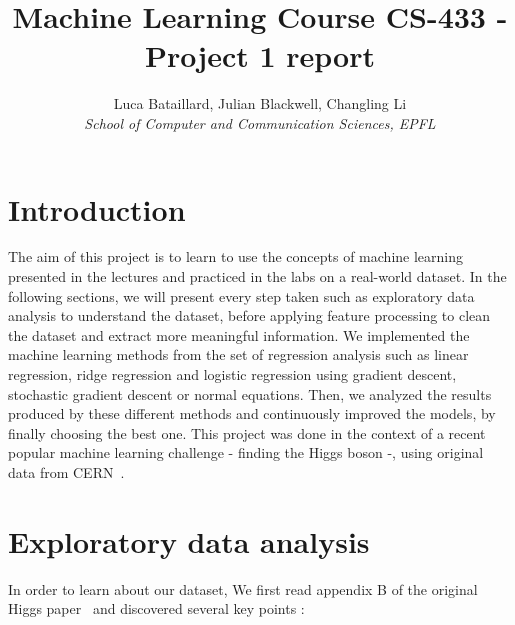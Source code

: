 \documentclass[10pt,conference,compsocconf]{IEEEtran}
\begin{document}
\title{Machine Learning Course CS-433 - Project 1 report}

\author{
  Luca Bataillard, Julian Blackwell, Changling Li\\
  \textit{School of Computer and Communication Sciences, EPFL}
}

\maketitle

\section{Introduction}
The aim of this project is to learn to use the concepts of machine learning presented in the lectures and practiced in the labs on a
real-world dataset. In the following sections, we will present every step taken such as exploratory data analysis to understand the dataset, before applying feature processing to clean the dataset and extract more meaningful information. We implemented the machine learning methods from the set of regression analysis such as linear regression, ridge regression and logistic regression using gradient descent, stochastic gradient descent or normal equations. Then, we analyzed the results produced by these different methods and continuously improved the models, by finally choosing the best one. This project was done in the context of a recent popular machine learning challenge - finding the Higgs boson -, using original data from CERN~\cite{higgs}.

\section{Exploratory data analysis}
\label{sec:structure-paper}

In order to learn about our dataset, We first read appendix B of the original Higgs paper~\cite{higgs} and discovered several key points : 
\end{document}
